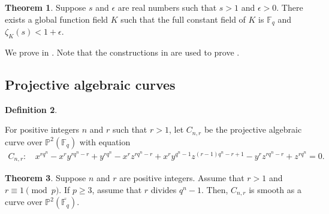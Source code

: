 \documentclass[12pt,letterpaper]{amsart}
\theoremstyle{definition}
\newtheorem{theorem}{Theorem}[section]
\newtheorem{definition}[theorem]{Definition}
\begin{document}
\begin{theorem}
\label{thm:closeto1}
Suppose $s$ and $\epsilon$ are real numbers such that $s>1$ and $\epsilon>0$. There exists a global function field $K$ such that the full constant field of $K$ is $\mathbb{F}_q$ and $\zeta_K(s)<1+\epsilon$.
\end{theorem}

We prove  in . Note that the constructions in  are used to prove .

\subsection{Projective algebraic curves}
\label{subsec:projalg}

\begin{definition}
\label{def:projalg}

For positive integers $n$ and $r$ such that $r>1$, let $C_{n,r}$ be the projective algebraic curve over $\mathbb{P}^2(\mathbb{F}_q)$ with equation
\begin{align*}
C_{n,r}:\, & x^{rq^n}-x^ry^{rq^n-r}+y^{rq^n} -x^rz^{rq^n-r}+x^ry^{q^n-1}z^{(r-1)q^n-r+1}-y^rz^{rq^n-r}
+z^{rq^n}=0.
\end{align*}
\end{definition}

\begin{theorem}
\label{thm:smooth}
Suppose $n$ and $r$ are positive integers. Assume that $r>1$ and $r\equiv 1\pmod{p}$. If $p\geq 3$, assume that $r$ divides $q^n-1$. Then, $C_{n,r}$ is smooth as a curve over $\mathbb{P}^2(\overline{\mathbb{F}_q})$.
\end{theorem}
\end{document}
